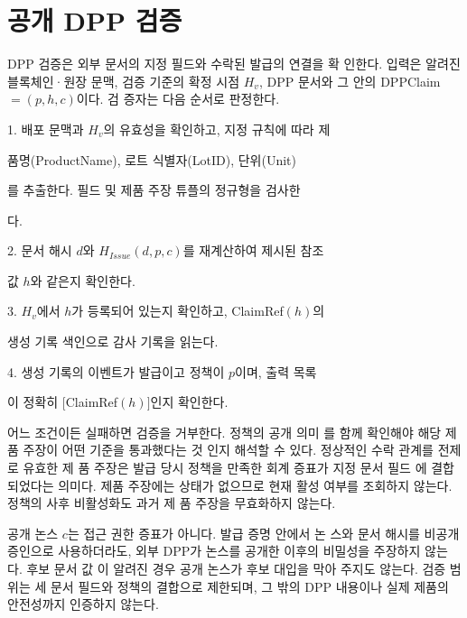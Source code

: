 \section{공개 DPP 검증}
DPP 검증은 외부 문서의 지정 필드와 수락된 발급의 연결을 확
인한다. 입력은 알려진 블록체인·원장 문맥, 검증 기준의 확정
시점 \(H_{v}\), DPP 문서와 그 안의 DPPClaim \(=(p,h,c)\)이다. 검
증자는 다음 순서로 판정한다.

1. 배포 문맥과 \(H_{v}\)의 유효성을 확인하고, 지정 규칙에 따라 제

품명(ProductName), 로트 식별자(LotID), 단위(Unit)

를 추출한다. 필드 및 제품 주장 튜플의 정규형을 검사한

다.

2. 문서 해시 \(d\)와 \(H_{Issue}(d,p,c)\)를 재계산하여 제시된 참조

값 \(h\)와 같은지 확인한다.

3. \(H_{v}\)에서 \(h\)가 등록되어 있는지 확인하고, ClaimRef\((h)\)의

생성 기록 색인으로 감사 기록을 읽는다.

4. 생성 기록의 이벤트가 발급이고 정책이 \(p\)이며, 출력 목록

이 정확히 \([\)ClaimRef\((h)]\)인지 확인한다.

어느 조건이든 실패하면 검증을 거부한다. 정책의 공개 의미
를 함께 확인해야 해당 제품 주장이 어떤 기준을 통과했다는 것
인지 해석할 수 있다. 정상적인 수락 관계를 전제로 유효한 제
품 주장은 발급 당시 정책을 만족한 회계 증표가 지정 문서 필드
에 결합되었다는 의미다. 제품 주장에는 상태가 없으므로 현재
활성 여부를 조회하지 않는다. 정책의 사후 비활성화도 과거 제
품 주장을 무효화하지 않는다.

공개 논스 \(c\)는 접근 권한 증표가 아니다. 발급 증명 안에서 논
스와 문서 해시를 비공개 증인으로 사용하더라도, 외부 DPP가
논스를 공개한 이후의 비밀성을 주장하지 않는다. 후보 문서 값
이 알려진 경우 공개 논스가 후보 대입을 막아 주지도 않는다.
검증 범위는 세 문서 필드와 정책의 결합으로 제한되며, 그 밖의
DPP 내용이나 실제 제품의 안전성까지 인증하지 않는다.

